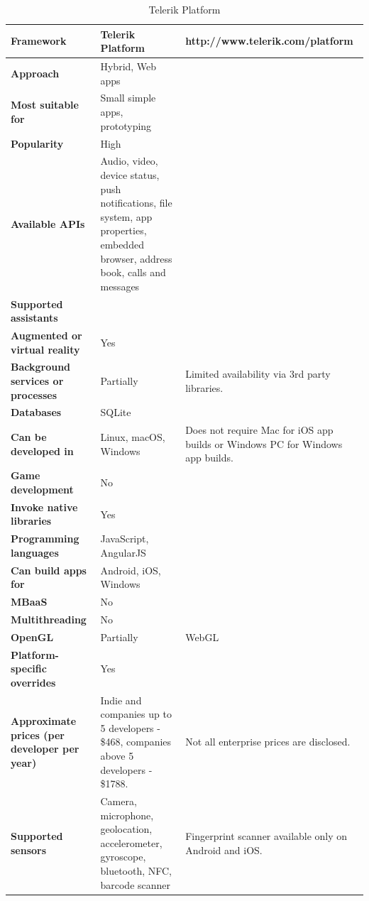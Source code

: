 \documentclass[english,master,public,dept460,male,cpdeclaration,oneside]{diploma}
\begin{document}
\begin{table}[!h]
	\centering
	\caption{Telerik Platform}
	\begin{tabular}{p{} | p{} | p{}}
		\toprule		
		\textbf{Framework} & \textbf{Telerik Platform} & http://www.telerik.com/platform \\
		\midrule
		\textbf{Approach} & Hybrid, Web apps & \\			
		\midrule	
		\textbf{Most suitable for} & Small simple apps, prototyping & \\
		\midrule
		\textbf{Popularity} & High & \\			
		\midrule
		\textbf{Available APIs} & Audio, video, device status, push notifications, file system, app properties, embedded browser, address book, calls and messages & \\			
		\midrule
		\textbf{Supported assistants} & & \\			
		\midrule
		\textbf{Augmented or virtual reality} & Yes & \\			
		\midrule
		\textbf{Background services or processes} & Partially & Limited availability via 3rd party libraries. \\			
		\midrule
		\textbf{Databases} & SQLite & \\			
		\midrule
		\textbf{Can be developed in} & Linux, macOS, Windows & Does not require Mac for iOS app builds or Windows PC for Windows app builds. \\			
		\midrule
		\textbf{Game development} & No & \\			
		\midrule
		\textbf{Invoke native libraries} & Yes & \\			
		\midrule
		\textbf{Programming languages} & JavaScript, AngularJS & \\			
		\midrule
		\textbf{Can build apps for} & Android, iOS, Windows & \\			
		\midrule
		\textbf{MBaaS} & No & \\			
		\midrule
		\textbf{Multithreading} & No & \\			
		\midrule
		\textbf{OpenGL} & Partially & WebGL \\			
		\midrule
		\textbf{Platform-specific overrides} & Yes & \\			
		\midrule
		\textbf{Approximate prices (per developer per year)} & Indie and companies up to 5 developers - \$468, companies above 5 developers - \$1788. & Not all enterprise prices are disclosed. \\			
		\midrule
		\textbf{Supported sensors} & Camera, microphone, geolocation, accelerometer, gyroscope, bluetooth, NFC, barcode scanner & Fingerprint scanner available only on Android and iOS. \\			
		\midrule
	\end{tabular}
\end{table}
\end{document}
